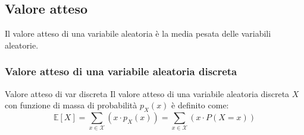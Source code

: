 \documentclass{article}  %
\theoremstyle{definition}
\begin{document}
\subsection{Valore atteso}
Il valore atteso di una variabile aleatoria è la media pesata delle variabili aleatorie.
\subsubsection{Valore atteso di una variabile aleatoria discreta}
\begin{theorem}{Valore atteso di var discreta}
	Il valore atteso di una variabile aleatoria discreta $X$ con funzione di massa di probabilità $p_X(x)$ è definito come:
	\[
		\mathbb{E}[X]=\sum_{x \in \mathscr{X}}(x \cdot p_X(x))=\sum_{x \in \mathscr{X}}(x \cdot P(X=x))
	\]
\end{theorem}
\end{document}

